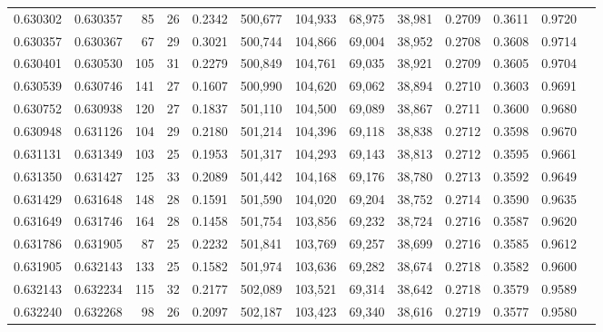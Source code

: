 \begin{tabular}{rrrrrrrrrrrrr}
0.630302 & 0.630357 &     85 &    26 &                                     0.2342 & 500,677 & 104,933 &  68,975 &  38,981 & 0.2709 & 0.3611 & 0.9720 \\
0.630357 & 0.630367 &     67 &    29 &                                     0.3021 & 500,744 & 104,866 &  69,004 &  38,952 & 0.2708 & 0.3608 & 0.9714 \\
0.630401 & 0.630530 &    105 &    31 &                                     0.2279 & 500,849 & 104,761 &  69,035 &  38,921 & 0.2709 & 0.3605 & 0.9704 \\
0.630539 & 0.630746 &    141 &    27 &                                     0.1607 & 500,990 & 104,620 &  69,062 &  38,894 & 0.2710 & 0.3603 & 0.9691 \\
0.630752 & 0.630938 &    120 &    27 &                                     0.1837 & 501,110 & 104,500 &  69,089 &  38,867 & 0.2711 & 0.3600 & 0.9680 \\
0.630948 & 0.631126 &    104 &    29 &                                     0.2180 & 501,214 & 104,396 &  69,118 &  38,838 & 0.2712 & 0.3598 & 0.9670 \\
0.631131 & 0.631349 &    103 &    25 &                                     0.1953 & 501,317 & 104,293 &  69,143 &  38,813 & 0.2712 & 0.3595 & 0.9661 \\
0.631350 & 0.631427 &    125 &    33 &                                     0.2089 & 501,442 & 104,168 &  69,176 &  38,780 & 0.2713 & 0.3592 & 0.9649 \\
0.631429 & 0.631648 &    148 &    28 &                                     0.1591 & 501,590 & 104,020 &  69,204 &  38,752 & 0.2714 & 0.3590 & 0.9635 \\
0.631649 & 0.631746 &    164 &    28 &                                     0.1458 & 501,754 & 103,856 &  69,232 &  38,724 & 0.2716 & 0.3587 & 0.9620 \\
0.631786 & 0.631905 &     87 &    25 &                                     0.2232 & 501,841 & 103,769 &  69,257 &  38,699 & 0.2716 & 0.3585 & 0.9612 \\
0.631905 & 0.632143 &    133 &    25 &                                     0.1582 & 501,974 & 103,636 &  69,282 &  38,674 & 0.2718 & 0.3582 & 0.9600 \\
0.632143 & 0.632234 &    115 &    32 &                                     0.2177 & 502,089 & 103,521 &  69,314 &  38,642 & 0.2718 & 0.3579 & 0.9589 \\
0.632240 & 0.632268 &     98 &    26 &                                     0.2097 & 502,187 & 103,423 &  69,340 &  38,616 & 0.2719 & 0.3577 & 0.9580 \\

\end{tabular}
